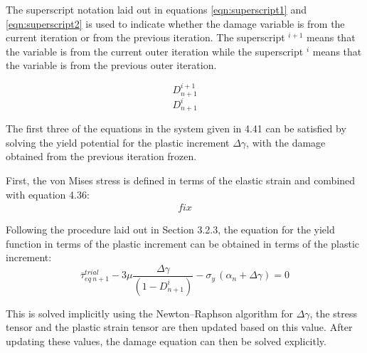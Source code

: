 \documentclass[sn-mathphys,Numbered,draft]{sn-jnl}%
\begin{document}
The superscript notation laid out in equations \ref{eqn:superscript1} and \ref{eqn:superscript2} is used to indicate whether the damage variable is from the current iteration or from the previous iteration. The superscript $^{i+1}$ means that the variable is from the current outer iteration while the superscript $^{i}$ means that the variable is from the previous outer iteration.

\begin{equation}
\label{eqn:superscript1}
    D^{i+1}_{n+1}
\end{equation}
\begin{equation}
\label{eqn:superscript2}
    D^{i}_{n+1}
\end{equation}


The first three of the equations in the system given in 4.41 can be satisfied by solving the yield potential for the plastic increment $\Delta\gamma$, with the damage obtained from the previous iteration frozen. 

First, the von Mises stress is defined in terms of the elastic strain and combined with equation 4.36:
\begin{equation}
\begin{aligned}
fix
\end{aligned}
\end{equation}

Following the procedure laid out in Section 3.2.3, the equation for the yield function in terms of the plastic increment can be obtained in terms of the plastic increment:
\begin{equation}
	\bar{\tau}_{eq\ n+1}^{trial}-3\mu\frac{\Delta\gamma}{\left(1-D^{i}_{n+1}\right)}-\sigma_{y\ }\left(\alpha_n+\Delta\gamma\right)=0
\end{equation}

This is solved implicitly using the Newton–Raphson algorithm for $\Delta\gamma$, the stress tensor and the plastic strain tensor are then updated based on this value.  
After updating these values, the damage equation can then be solved explicitly.
\end{document}
